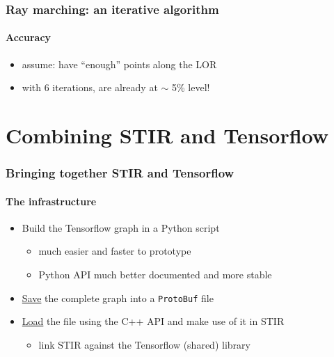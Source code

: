 \documentclass{beamer}
\begin{document}
\begin{frame}
  \frametitle{Ray marching: an iterative algorithm}
  \framesubtitle{Accuracy}
  \begin{itemize}
    \item assume: have ``enough'' points along the LOR
  \end{itemize}
  \begin{figure}
    \centering
  \end{figure}
  \begin{itemize}
    \item with 6 iterations, are already at $\sim$ 5\% level!
  \end{itemize}
\end{frame}

\section{Combining STIR and Tensorflow}
\begin{frame}
  \frametitle{Bringing together STIR and Tensorflow}
  \framesubtitle{The infrastructure}
  \begin{itemize}
    \item Build the Tensorflow graph in a Python script
      \begin{itemize}
        \item much easier and faster to prototype
        \item Python API much better documented and more stable
      \end{itemize}
      \pause
    \item \underline{Save} the complete graph into a \texttt{ProtoBuf} file
      \pause
    \item \underline{Load} the file using the C++ API and make use of it in STIR
      \begin{itemize}
        \item link STIR against the Tensorflow (shared) library
      \end{itemize}
  \end{itemize}
\end{frame}
\end{document}
